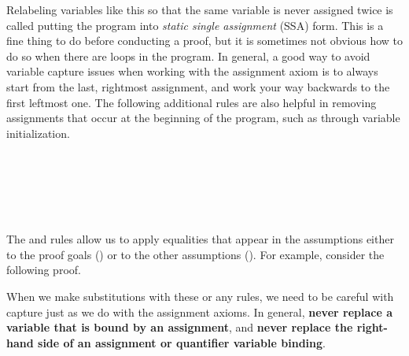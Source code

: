 \documentclass[11pt,twoside]{scrartcl}
\begin{document}
Relabeling variables like this so that the same variable is never assigned twice is called putting the program into \emph{static single assignment} (SSA) form.
This is a fine thing to do before conducting a proof, but it is sometimes not obvious how to do so when there are loops in the program.
In general, a good way to avoid variable capture issues when working with the assignment axiom is to always start from the last, rightmost assignment, and work your way backwards to the first leftmost one.
The following additional rules are also helpful in removing assignments that occur at the beginning of the program, such as through variable initialization.
\\

  \begin{calculus}
    {
      {}
    }{}%
  \end{calculus}~~~~%
  \begin{calculus}
    {
      {}
    }{}%
  \end{calculus}~~~~%
  \begin{calculus}
  {
    {\lsequent[L]{} {}}
   ~~
  }
  {}
  \end{calculus}

\vspace{1ex}
The  and  rules allow us to apply equalities that appear in the assumptions either to the proof goals () or to the other assumptions ().
For example, consider the following proof.
\begin{sequentdeduction}[array]
 {
}
\end{sequentdeduction}
When we make substitutions with these or any rules, we need to be careful with capture just as we do with the assignment axioms.
In general, \textbf{never replace a variable that is bound by an assignment}, and \textbf{never replace the right-hand side of an assignment or quantifier variable binding}.
\end{document}
